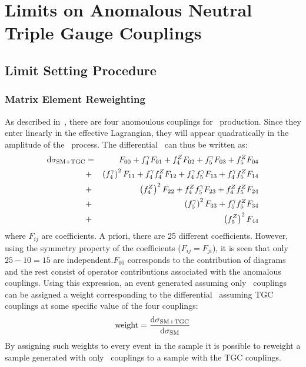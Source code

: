 \graphicspath{{Chapters/TGCLimits/Figures/}}
\chapter{Limits on Anomalous Neutral Triple Gauge Couplings}
\label{chap:TGCLimits}

\section{Limit Setting Procedure}

\subsection{Matrix Element Reweighting}
As described in~\sec{}, there are four anomoulous couplings for \ZZ\ production.
Since they enter linearly in the effective Lagrangian, they will appear
quadratically in the amplitude of the \ZZllll\ process. The differential \cx\
can thus be written as:
\begin{eqnarray}\label{eqn:dsigma}
{\rm d}\sigma_{\rm SM+TGC} & = & F_{00} + f_4^\gamma F_{01} + f_4^Z F_{02} + f_5^\gamma F_{03} + f_5^Z F_{04}  \nonumber \\
&+& \left(f_4^\gamma\right)^2F_{11} + f_4^\gamma f_4^Z F_{12} +  f_4^\gamma f_5^\gamma F_{13} + f_4^\gamma f_5^Z F_{14}  \nonumber \\
&+& \left(f_4^Z\right)^2F_{22} + f_4^Zf_5^\gamma F_{23} + f_4^Zf_5^Z F_{24}  \nonumber \\
&+& \left(f_5^\gamma\right)^2F_{33} + f_5^\gamma f_5^Z F_{34} \nonumber \\
&+& \left(f_5^Z\right)^2F_{44}
\end{eqnarray}
where $F_{ij}$ are coefficients. A priori, there are 25 different coefficients. However, using the 
symmetry property of the coefficients ($F_{ij}=F_{ji}$), it is seen 
that only $25-10=15$ are independent.$F_{00}$ corresponds to the contribution of \sm
diagrams and the rest consist of operator contributions associated with the
anomalous couplings. Using this expression, an event generated assuming only
\sm\ couplings can be assigned a weight corresponding to the differential \cx\ assuming TGC couplings
at some specific value of the four couplings:
\begin{equation}
{\rm weight} = \frac{{\rm d}\sigma_{\rm SM+TGC}}{{\rm d}\sigma_{\rm SM}}
\end{equation}
By assigning such weights to every event in the sample it is possible to reweight a sample
generated with only \sm\ couplings to a sample with the TGC couplings.
